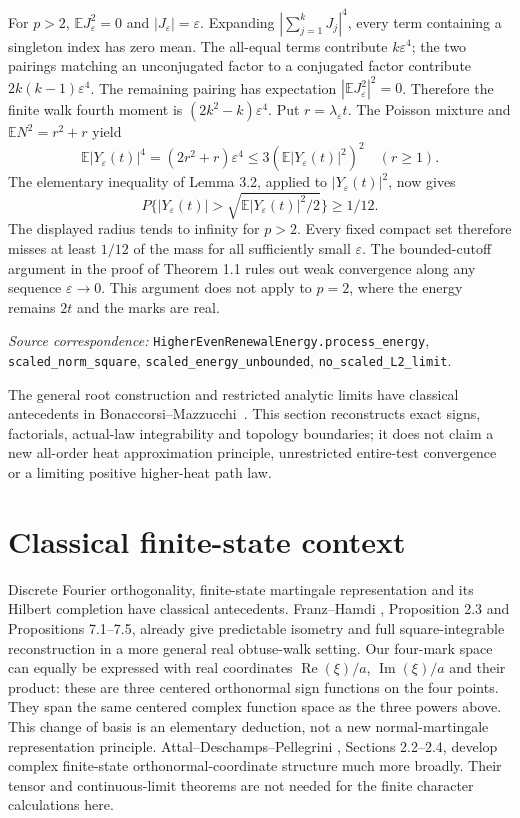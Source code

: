 \documentclass[11pt]{article}
\newcommand{\E}{\mathbb E}\newcommand{\Pp}{\mathbb P}
\newcommand{\code}[1]{{\small\nolinkurl{#1}}}
\begin{document}
For $p>2$, $\E J_\varepsilon^2=0$ and $|J_\varepsilon|=\varepsilon$.
Expanding $|\sum_{j=1}^kJ_j|^4$, every term containing a singleton
index has zero mean. The all-equal terms contribute $k\varepsilon^4$;
the two pairings matching an unconjugated factor to a conjugated
factor contribute $2k(k-1)\varepsilon^4$. The remaining pairing
has expectation $|\E J_\varepsilon^2|^2=0$. Therefore the finite
walk fourth moment is $(2k^2-k)\varepsilon^4$.
Put $r=\lambda_\varepsilon t$. The Poisson mixture and
$\E N^2=r^2+r$ yield
\[
 \E|Y_\varepsilon(t)|^4=(2r^2+r)\varepsilon^4
              \leq3(\E|Y_\varepsilon(t)|^2)^2\quad(r\geq1).
\]
The elementary inequality of Lemma 3.2, applied to
$|Y_\varepsilon(t)|^2$, now gives
\[
 P\{|Y_\varepsilon(t)|>
       \sqrt{\E|Y_\varepsilon(t)|^2/2}\}\geq1/12.
\]
The displayed radius tends to infinity for $p>2$. Every fixed
compact set therefore misses at least $1/12$ of the mass for all
sufficiently small $\varepsilon$. The bounded-cutoff argument in
the proof of Theorem 1.1 rules out weak convergence along any
sequence $\varepsilon\to0$. This argument does not apply to
$p=2$, where the energy remains $2t$ and the marks are real.
\par\smallskip\begingroup\small\raggedright
\noindent\textit{Source correspondence:}
\code{HigherEvenRenewalEnergy.process_energy},
\code{scaled_norm_square}, \code{scaled_energy_unbounded},
\code{no_scaled_L2_limit}.\par\endgroup
The general root construction and restricted analytic limits have
classical antecedents in Bonaccorsi--Mazzucchi~\cite{BM}.
This section reconstructs exact signs, factorials, actual-law
integrability and topology boundaries; it does not claim a new
all-order heat approximation principle, unrestricted entire-test
convergence or a limiting positive higher-heat path law.

\section{Classical finite-state context}
Discrete Fourier orthogonality, finite-state martingale representation
and its Hilbert completion have classical antecedents.
Franz--Hamdi \cite{FH}, Proposition 2.3 and Propositions 7.1--7.5,
already give predictable isometry and full square-integrable
reconstruction in a more general real obtuse-walk setting.
Our four-mark space can equally be expressed with real coordinates
$\operatorname{Re}(\xi)/a$, $\operatorname{Im}(\xi)/a$ and their product:
these are three centered orthonormal sign functions on the four
points. They span the same centered complex function space as the
three powers above. This change of basis is an elementary deduction,
not a new normal-martingale representation principle.
Attal--Deschamps--Pellegrini \cite{ADP}, Sections 2.2--2.4, develop
complex finite-state orthonormal-coordinate structure much more
broadly. Their tensor and continuous-limit theorems are not needed
for the finite character calculations here.
\end{document}
